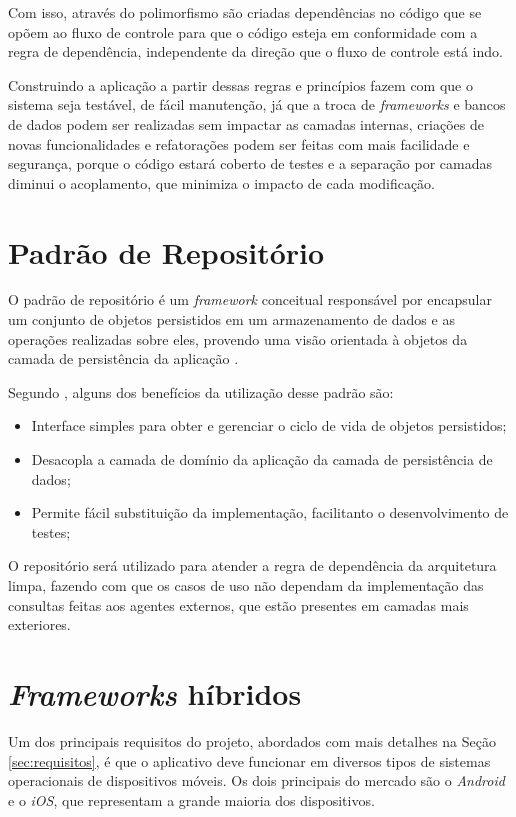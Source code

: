 Com isso, através do polimorfismo são criadas dependências no código que se opõem ao fluxo de controle para que o código esteja em conformidade com a regra de dependência, independente da direção que o fluxo de controle está indo.

Construindo a aplicação a partir dessas regras e princípios fazem com que o sistema seja testável, de fácil manutenção, já que a troca de \textit{frameworks} e bancos de dados podem ser realizadas sem impactar as camadas internas, criações de novas funcionalidades e refatorações podem ser feitas com mais facilidade e segurança, porque o código estará coberto de testes e a separação por camadas diminui o acoplamento, que minimiza o impacto de cada modificação.

\section{Padrão de Repositório}\label{sec:repositorypattern}

O padrão de repositório é um \textit{framework} conceitual responsável por encapsular um conjunto de objetos persistidos em um armazenamento de dados e as operações realizadas sobre eles, provendo uma visão orientada à objetos da camada de persistência da aplicação \cite{patterns}.

Segundo \textcite{ddd}, alguns dos benefícios da utilização desse padrão são:

\begin{itemize}
    \item Interface simples para obter e gerenciar o ciclo de vida de objetos persistidos;
    \item Desacopla a camada de domínio da aplicação da camada de persistência de dados;
    \item Permite fácil substituição da implementação, facilitanto o desenvolvimento de testes;
\end{itemize}

O repositório será utilizado para atender a regra de dependência da arquitetura limpa, fazendo com que os casos de uso não dependam da implementação das consultas feitas aos agentes externos, que estão presentes em camadas mais exteriores.

\section{\textit{Frameworks} híbridos}\label{sec:flutter}
Um dos principais requisitos do projeto, abordados com mais detalhes na Seção \ref{sec:requisitos}, é que o aplicativo deve funcionar em diversos tipos de sistemas operacionais de dispositivos móveis. Os dois principais do mercado são o \textit{Android} e o \textit{iOS}, que representam a grande maioria dos dispositivos.

